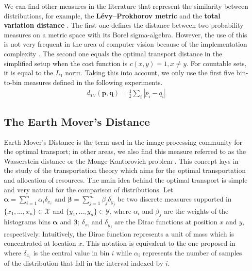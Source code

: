 We can find other measures in the literature that represent the similarity between distributions, for example, the \textbf{Lévy–Prokhorov metric} \citep{Prokhorov:TPA:1956} and the \textbf{total variation distance} \citep{Bogachev.Kolesnikov:RMS:2012}. The first one defines the distance between two probability measures on a metric space with its Borel sigma-algebra. However, the use of this is not very frequent in the area of computer vision because of the implementation complexity \citep{Bogachev.Kolesnikov:RMS:2012}. The second one equals the optimal transport distance \citep{Cuturi.Avis:JMLR:2011} in the simplified setup when the cost function is $c(x,y)=1, x\neq y$. For countable sets, it is equal to the $L_1$ norm. Taking this into account, we only use the first five bin-to-bin measures defined in the following experiments.
\begin{eqnarray}
d_{TV}(\mathbf{p}, \mathbf{q}) = \frac{1}{2}\sum\nolimits_{i}|p_i - q_i | \label{eq:tv_dist}
\end{eqnarray}


\subsection{The Earth Mover's Distance}\label{subsec:EMD}
Earth Mover's Distance is the term used in the image processing community for the optimal transport; in other areas, we also find this measure referred to as the Wasserstein distance \citep{Gibbs.Su:ISR:2002} or the Monge-Kantorovich problem \citep{Bogachev.Kolesnikov:RMS:2012, Kantorovich:JMS:2006}. This concept lays in the study of the transportation theory which aims for the optimal transportation and allocation of resources. 
The main idea behind the optimal transport is simple and very natural for the comparison of distributions. Let
$
\boldsymbol{\alpha} = \sum_{i=1}^{n}\alpha_{i}\delta_{x_i} \text{  and  } \boldsymbol{\beta} = \sum_{j=1}^{m}\beta_{j}\delta_{y_j}
$
be two discrete measures supported in $\{x_1, \ldots, x_n\} \in \mathcal{X}$ and $\{y_1, \ldots, y_n\} \in \mathcal{Y}$, where $\alpha_i$ and $\beta_j$ are the weights of the histograms bins $\boldsymbol{\alpha}$ and $\boldsymbol{\beta}$; $\delta_{x_i}$ and $\delta_{y_j}$ are the Dirac functions at position $x$ and $y$, respectively. Intuitively, the Dirac function represents a unit of mass which is concentrated at location $x$. This notation is equivalent to the one proposed in \citep{Rubner.Tomasi.ea:IJCV:2000} where $\delta_{x_i}$ is the central value in bin $i$ while $\alpha_i$ represents the number of samples of the distribution that fall in the interval indexed by $i$.

